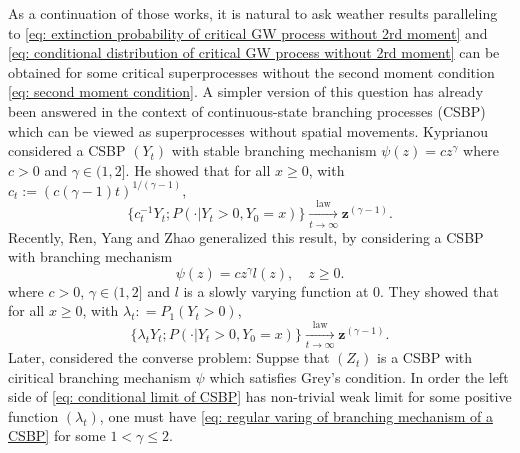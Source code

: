 \documentclass[12pt, a4paper]{amsart}
\theoremstyle{definition}
\numberwithin{equation}{section}
\begin{document}
	As a continuation of those works, it is natural to ask weather results paralleling to \eqref{eq: extinction probability of critical GW process without 2rd moment} and \eqref{eq: conditional distribution of critical GW process without 2rd moment} can be obtained for some critical superprocesses without the second moment condition \eqref{eq: second moment condition}.
	A simpler
	version of this question has already been answered in the context of continuous-state branching processes (CSBP) which can be viewed as superprocesses without spatial movements.
	Kyprianou \cite{Kyprianou2008Continuous} considered a CSBP $(Y_t)$ with stable branching mechanism $\psi(z) =c z^\gamma$ where $c > 0$ and $\gamma \in (1,2]$. He showed that for all $x\geq 0$, with $c_t := (c(\gamma - 1)t)^{1/(\gamma - 1)}$,
\[ \label{eq: conditional limit of CSBP with stable branching}
	\{c_t^{-1}Y_t; P( \cdot |Y_t > 0,Y_0 = x)\}
	\xrightarrow[t\to \infty]{\operatorname{law}} \mathbf z^{(\gamma - 1)}.
\]
	Recently, Ren, Yang and Zhao \cite{RenYangZhao2014Conditional} generalized this result, by considering a CSBP with branching mechanism
\[\label{eq: regular varing of branching mechanism of a CSBP}
	\psi(z)
	= c z^\gamma l(z),
	\quad z\geq 0.
\]
	where $c > 0$, $\gamma \in (1,2]$ and $l$ is a slowly varying function at $0$.
	They showed that for all $x\geq 0$, with $\lambda_t: = P_1(Y_t > 0)$,
\[\label{eq: conditional limit of CSBP}
	\{ \lambda_t Y_t ; P(\cdot | Y_t > 0, Y_0 = x)\}
	\xrightarrow[t\to \infty]{\operatorname{law}} \mathbf z^{(\gamma - 1)}.
\]
	Later, \cite{IyerLegerPego2015Limit} considered the converse problem: Suppse that $(Z_t)$ is a CSBP with ciritical branching mechanism $\psi$ 
	which satisfies Grey's condition.
	In order the left side of  \eqref{eq: conditional limit of CSBP} has non-trivial weak limit for some positive function $(\lambda_t)$, one must have \eqref{eq: regular varing of branching mechanism of a CSBP} for some $1< \gamma \leq 2$.
	
\end{document}
